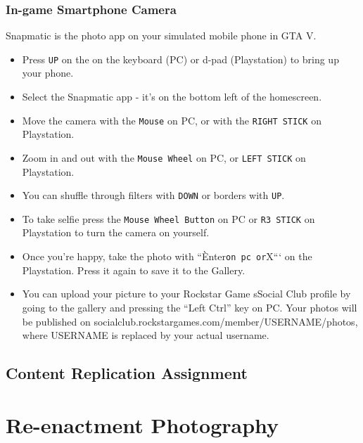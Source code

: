 \documentclass[
  openany]{book}
\begin{document}
\hypertarget{in-game-smartphone-camera}{%
\subsection*{In-game Smartphone Camera}\label{in-game-smartphone-camera}}

Snapmatic is the photo app on your simulated mobile phone in GTA V.

\begin{itemize}
\item
  Press \texttt{UP} on the on the keyboard (PC) or d-pad (Playstation) to bring up your phone.
\item
  Select the Snapmatic app - it's on the bottom left of the homescreen.
\item
  Move the camera with the \texttt{Mouse} on PC, or with the \texttt{RIGHT\ STICK} on Playstation.
\item
  Zoom in and out with the \texttt{Mouse\ Wheel} on PC, or \texttt{LEFT\ STICK} on Playstation.
\item
  You can shuffle through filters with \texttt{DOWN} or borders with \texttt{UP}.
\item
  To take selfie press the \texttt{Mouse\ Wheel\ Button} on PC or \texttt{R3\ STICK} on Playstation to turn the camera on yourself.
\item
  Once you're happy, take the photo with ``Ènter\texttt{on\ pc\ or}X``` on the Playstation. Press it again to save it to the Gallery.
\item
  You can upload your picture to your Rockstar Game sSocial Club profile by going to the gallery and pressing the ``Left Ctrl'' key on PC. Your photos will be published on socialclub.rockstargames.com/member/USERNAME/photos, where USERNAME is replaced by your actual username.
\end{itemize}

\hypertarget{content-replication-assignment-1}{%
\section*{Content Replication Assignment}\label{content-replication-assignment-1}}

\hypertarget{re-enactment-photography}{%
\chapter{Re-enactment Photography}\label{re-enactment-photography}}
\end{document}

